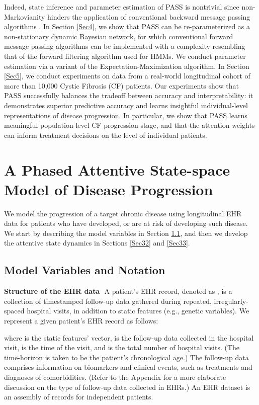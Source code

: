 \documentclass[twoside,11pt]{article}
\begin{document}
Indeed, state inference and parameter estimation of PASS is nontrivial since non-Markovianity hinders the application of conventional backward message passing algorithms \cite{alaa2016hidden,dai2016recurrent}. In Section \ref{Sec4}, we show that PASS can be re-parameterized as a non-stationary dynamic Bayesian network, for which conventional forward message passing algorithms can be implemented with a complexity resembling that of the forward filtering algorithm used for HMMs. We conduct parameter estimation via a variant of the Expectation-Maximization algorithm. In Section \ref{Sec5}, we conduct experiments on data from a real-world longitudinal cohort of more than 10,000 Cystic Fibrosis (CF) patients. Our experiments show that PASS successfully balances the tradeoff between accuracy and interpretability: it demonstrates superior predictive accuracy and learns insightful individual-level representations of disease progression. In particular, we show that PASS learns meaningful population-level CF progression stage, and that the attention weights can inform treatment decisions on the level of individual patients.    

\section{A Phased Attentive State-space Model of Disease Progression}
\label{Sec3}
We model the progression of a target chronic disease using longitudinal EHR data for patients who have developed, or are at risk of developing such disease. We start by describing the model variables in Section \ref{Sec31}, and then we develop the attentive state dynamics in Sections \ref{Sec32} and \ref{Sec33}. 
     
\subsection{Model Variables and Notation}
\label{Sec31} 
{\bf Structure of the EHR data}\,\, A patient's EHR record, denoted as \mbox{\footnotesize }, is a collection of timestamped follow-up data gathered during repeated, irregularly-spaced hospital visits, in addition to static features (e.g., genetic variables). We represent a given patient's EHR record as follows:  
    
where \mbox{\footnotesize } is the static features' vector, \mbox{\footnotesize } is the follow-up data collected in the \mbox{\footnotesize } hospital visit, \mbox{\footnotesize } is the time of the \mbox{\footnotesize } visit, and \mbox{\footnotesize } is the total number of hospital visits. (The time-horizon \mbox{\footnotesize } is taken to be the patient's chronological age.) The follow-up data \mbox{\footnotesize } comprises information on biomarkers and clinical events, such as treatments and diagnoses of comorbidities. (Refer to the Appendix for a more elaborate discussion on the type of follow-up data collected in EHRs.) An EHR dataset \mbox{\footnotesize } is an assembly of records for \mbox{\footnotesize } independent patients. 
\end{document}
